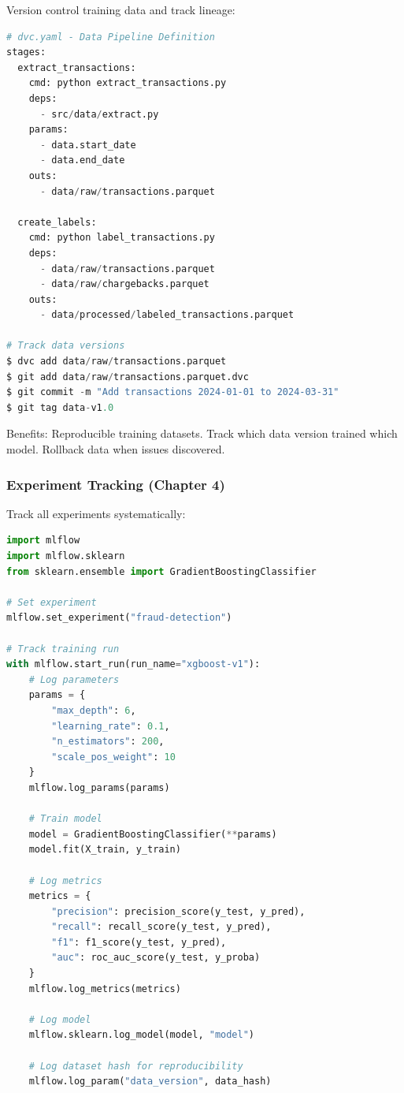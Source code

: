 Version control training data and track lineage:

\begin{lstlisting}[language=Python, caption={Data Versioning with DVC}]
# dvc.yaml - Data Pipeline Definition
stages:
  extract_transactions:
    cmd: python extract_transactions.py
    deps:
      - src/data/extract.py
    params:
      - data.start_date
      - data.end_date
    outs:
      - data/raw/transactions.parquet

  create_labels:
    cmd: python label_transactions.py
    deps:
      - data/raw/transactions.parquet
      - data/raw/chargebacks.parquet
    outs:
      - data/processed/labeled_transactions.parquet

# Track data versions
$ dvc add data/raw/transactions.parquet
$ git add data/raw/transactions.parquet.dvc
$ git commit -m "Add transactions 2024-01-01 to 2024-03-31"
$ git tag data-v1.0
\end{lstlisting}

Benefits: Reproducible training datasets. Track which data version trained which model. Rollback data when issues discovered.

\subsubsection{Experiment Tracking (Chapter 4)}

Track all experiments systematically:

\begin{lstlisting}[language=Python, caption={MLflow Experiment Tracking}]
import mlflow
import mlflow.sklearn
from sklearn.ensemble import GradientBoostingClassifier

# Set experiment
mlflow.set_experiment("fraud-detection")

# Track training run
with mlflow.start_run(run_name="xgboost-v1"):
    # Log parameters
    params = {
        "max_depth": 6,
        "learning_rate": 0.1,
        "n_estimators": 200,
        "scale_pos_weight": 10
    }
    mlflow.log_params(params)

    # Train model
    model = GradientBoostingClassifier(**params)
    model.fit(X_train, y_train)

    # Log metrics
    metrics = {
        "precision": precision_score(y_test, y_pred),
        "recall": recall_score(y_test, y_pred),
        "f1": f1_score(y_test, y_pred),
        "auc": roc_auc_score(y_test, y_proba)
    }
    mlflow.log_metrics(metrics)

    # Log model
    mlflow.sklearn.log_model(model, "model")

    # Log dataset hash for reproducibility
    mlflow.log_param("data_version", data_hash)
\end{lstlisting}

